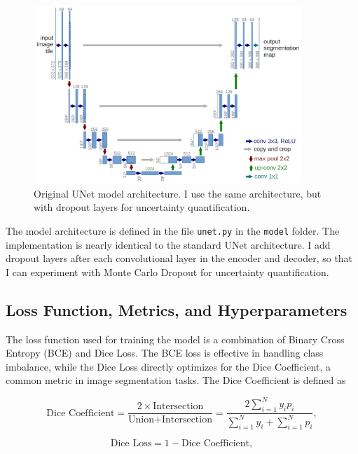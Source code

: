 \documentclass{article}
\begin{document}
\begin{figure}[h]
    \centering
    \includegraphics[width=0.9\textwidth]{../images/unet.png}
    \caption{Original UNet model architecture. I use the same architecture, but with dropout layers for uncertainty quantification.} 
    \label{fig:unet_architecture}
\end{figure}
\vspace{1em}

The model architecture is defined in the file \texttt{unet.py} in the \texttt{model} folder. The implementation
is nearly identical to the standard UNet architecture. I add dropout layers after each convolutional layer
in the encoder and decoder, so that I can experiment with Monte Carlo Dropout for uncertainty quantification.

\subsection{Loss Function, Metrics, and Hyperparameters}

The loss function used for training the model is a combination of Binary Cross Entropy (BCE) and Dice Loss.
The BCE loss is effective in handling class imbalance, while the Dice Loss directly optimizes for the Dice
Coefficient, a common metric in image segmentation tasks. The Dice Coefficient is defined as

\[
\text{Dice Coefficient} = \frac{2 \times \text{Intersection}}{\text{Union} + \text{Intersection}} = 
\frac{2 \sum_{i=1}^{N} y_i p_i}{\sum_{i=1}^{N} y_i + \sum_{i=1}^{N} p_i},
\]

\[
\text{Dice Loss} = 1 - \text{Dice Coefficient},
\]
\end{document}
